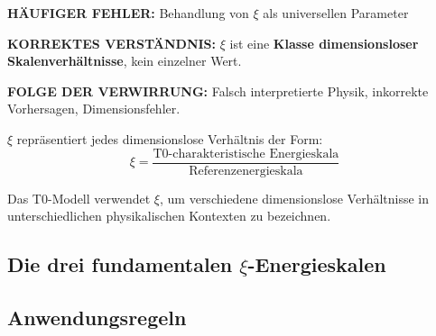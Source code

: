 	\begin{tcolorbox}[colback=red!10!white,colframe=red!75!black,title=KRITISCHE WARNUNG: $\xi$-Parameter-Verwirrung]
		\textbf{HÄUFIGER FEHLER:} Behandlung von $\xi$ als universellen Parameter
		
		\textbf{KORREKTES VERSTÄNDNIS:} $\xi$ ist eine \textbf{Klasse dimensionsloser Skalenverhältnisse}, kein einzelner Wert.
		
		\textbf{FOLGE DER VERWIRRUNG:} Falsch interpretierte Physik, inkorrekte Vorhersagen, Dimensionsfehler.
		
		$\xi$ repräsentiert jedes dimensionslose Verhältnis der Form:
		\begin{equation}
			\xi = \frac{\text{T0-charakteristische Energieskala}}{\text{Referenzenergieskala}}
		\end{equation}
		
		Das T0-Modell verwendet $\xi$, um verschiedene dimensionslose Verhältnisse in unterschiedlichen physikalischen Kontexten zu bezeichnen.
	\end{tcolorbox}
	
	\subsection{Die drei fundamentalen $\xi$-Energieskalen}
	
	\begin{table}[H]
		\centering
		\caption{Die drei fundamentalen $\xi$-Parametertypen im T0-Modell}
		\label{tab:xi_hierarchy}
	\end{table}
	
	\subsection{Anwendungsregeln}
	
